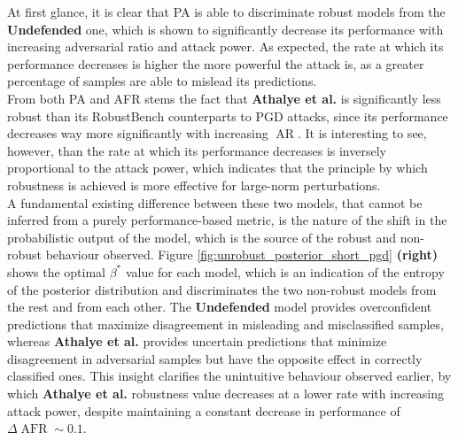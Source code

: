 At first glance, it is clear that PA is able to discriminate robust models from
the {\color{tab:orange} \textbf{Undefended}} one, which is shown to significantly
decrease its performance with increasing adversarial ratio and attack power. As expected, 
the rate at which its performance decreases is higher
the more powerful the attack is, as a greater percentage of samples are able to
mislead its predictions. \\

From both PA and AFR stems the fact that {\color{tab:green} \textbf{Athalye et al.}}
is significantly less robust than its RobustBench counterparts to PGD attacks, since 
its performance decreases
way more significantly with increasing $\operatorname{AR}$. It is interesting to see, however,
than the rate at which its performance decreases is inversely proportional to the 
attack power, which indicates that the principle by which robustness is achieved
is more effective for large-norm perturbations. \\

A fundamental existing difference between these two models, that cannot be
inferred from a purely performance-based metric, is the nature of the shift in
the probabilistic output of the model, which is the source of the robust and non-robust
behaviour observed. Figure \ref{fig:unrobust_posterior_short_pgd} \textbf{(right)}
shows the optimal $\beta^{*}$ value for each model, which is an indication of
the entropy of the posterior distribution and discriminates the two non-robust
models from the rest and from each other. The {\color{tab:orange} \textbf{Undefended}}
model provides overconfident predictions that maximize disagreement in misleading and 
misclassified samples, whereas {\color{tab:green} \textbf{Athalye et al.}} provides 
uncertain predictions that minimize disagreement in adversarial samples but have 
the opposite effect in correctly classified ones. This insight clarifies the 
unintuitive behaviour observed earlier, by which {\color{tab:green} \textbf{Athalye et al.}} 
robustness value decreases at a lower rate with increasing attack power, despite maintaining a
constant decrease in performance of $\Delta \operatorname{AFR} \sim 0.1$. \\

